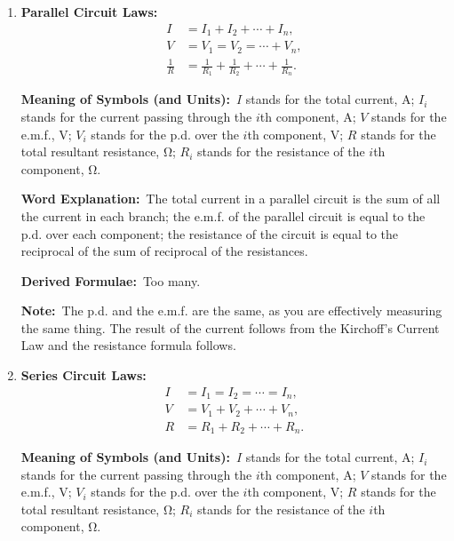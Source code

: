 \documentclass[8pt]{article}
\newcommand{\MeanSymb}{\textbf{Meaning of Symbols (and Units):}\ }
\newcommand{\WordExpl}{\textbf{Word Explanation:}\ }
\newcommand{\DeriForm}{\textbf{Derived Formulae:}\ }
\newcommand{\Note}{\textbf{Note:}\ }
\begin{document}
\begin{enumerate}
                \WordExpl The current flowing into a junction is equal to the current flowing out of a junction.

                \DeriForm The parallel circuit law (which will appear later).

                \Note This is a direct corollary from the conservation of charge.

                \item \textbf{Parallel Circuit Laws:}
                \begin{align*}
                    I &= I_1 + I_2 + \cdots + I_n,\\
                    V &= V_1 = V_2 = \cdots + V_n,\\
                    \frac{1}{R} &= \frac{1}{R_1} + \frac{1}{R_2} + \cdots + \frac{1}{R_n}.
                \end{align*}

                \MeanSymb \(I\) stands for the total current, \unit{\ampere}; \(I_i\) stands for the current passing through the \(i\)th component, \unit{\ampere}; \(V\) stands for the e.m.f., \unit{\volt}; \(V_i\) stands for the p.d. over the \(i\)th component, \unit{\volt}; \(R\) stands for the total resultant resistance, \unit{\ohm}; \(R_i\) stands for the resistance of the \(i\)th component, \unit{\ohm}.

                \WordExpl The total current in a parallel circuit is the sum of all the current in each branch; the e.m.f. of the parallel circuit is equal to the p.d. over each component; the resistance of the circuit is equal to the reciprocal of the sum of reciprocal of the resistances.

                \DeriForm Too many.

                \Note The p.d. and the e.m.f. are the same, as you are effectively measuring the same thing. The result of the current follows from the Kirchoff's Current Law and the resistance formula follows.

                \item \textbf{Series Circuit Laws:}
                \begin{align*}
                    I &= I_1 = I_2 = \cdots = I_n,\\
                    V &= V_1 + V_2 + \cdots + V_n,\\
                    R &= R_1 + R_2 + \cdots + R_n.
                \end{align*}

                \MeanSymb \(I\) stands for the total current, \unit{\ampere}; \(I_i\) stands for the current passing through the \(i\)th component, \unit{\ampere}; \(V\) stands for the e.m.f., \unit{\volt}; \(V_i\) stands for the p.d. over the \(i\)th component, \unit{\volt}; \(R\) stands for the total resultant resistance, \unit{\ohm}; \(R_i\) stands for the resistance of the \(i\)th component, \unit{\ohm}.


\end{enumerate}
\end{document}
